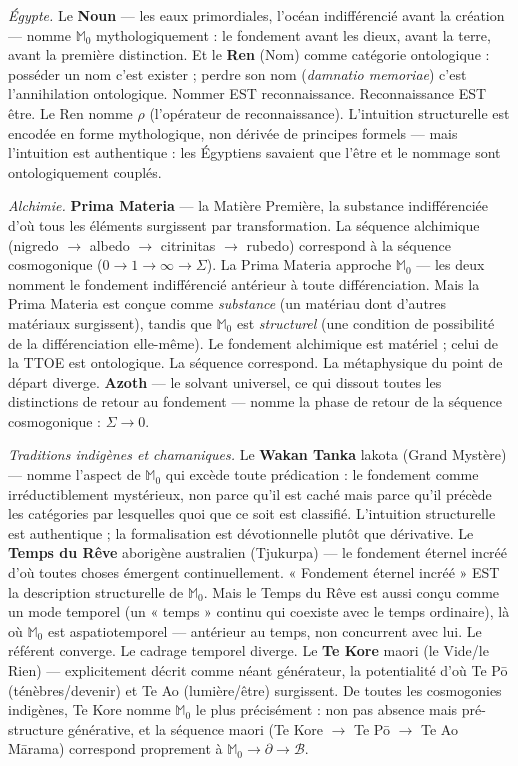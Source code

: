 \documentclass[10pt, openany, oneside]{book}
\begin{document}
\textit{Égypte.} Le \textbf{Noun} --- les eaux primordiales, l'océan indifférencié avant la création --- nomme $\mathbb{M}_0$ mythologiquement : le fondement avant les dieux, avant la terre, avant la première distinction. Et le \textbf{Ren} (Nom) comme catégorie ontologique : posséder un nom c'est exister ; perdre son nom (\textit{damnatio memoriae}) c'est l'annihilation ontologique. Nommer EST reconnaissance. Reconnaissance EST être. Le Ren nomme $\rho$ (l'opérateur de reconnaissance). L'intuition structurelle est encodée en forme mythologique, non dérivée de principes formels --- mais l'intuition est authentique : les Égyptiens savaient que l'être et le nommage sont ontologiquement couplés.

\textit{Alchimie.} \textbf{Prima Materia} --- la Matière Première, la substance indifférenciée d'où tous les éléments surgissent par transformation. La séquence alchimique (nigredo $\to$ albedo $\to$ citrinitas $\to$ rubedo) correspond à la séquence cosmogonique ($0 \to 1 \to \infty \to \Sigma$). La Prima Materia approche $\mathbb{M}_0$ --- les deux nomment le fondement indifférencié antérieur à toute différenciation. Mais la Prima Materia est conçue comme \textit{substance} (un matériau dont d'autres matériaux surgissent), tandis que $\mathbb{M}_0$ est \textit{structurel} (une condition de possibilité de la différenciation elle-même). Le fondement alchimique est matériel ; celui de la TTOE est ontologique. La séquence correspond. La métaphysique du point de départ diverge. \textbf{Azoth} --- le solvant universel, ce qui dissout toutes les distinctions de retour au fondement --- nomme la phase de retour de la séquence cosmogonique : $\Sigma \to 0$.

\textit{Traditions indigènes et chamaniques.} Le \textbf{Wakan Tanka} lakota (Grand Mystère) --- nomme l'aspect de $\mathbb{M}_0$ qui excède toute prédication : le fondement comme irréductiblement mystérieux, non parce qu'il est caché mais parce qu'il précède les catégories par lesquelles quoi que ce soit est classifié. L'intuition structurelle est authentique ; la formalisation est dévotionnelle plutôt que dérivative. Le \textbf{Temps du Rêve} aborigène australien (Tjukurpa) --- le fondement éternel incréé d'où toutes choses émergent continuellement. « Fondement éternel incréé » EST la description structurelle de $\mathbb{M}_0$. Mais le Temps du Rêve est aussi conçu comme un mode temporel (un « temps » continu qui coexiste avec le temps ordinaire), là où $\mathbb{M}_0$ est aspatiotemporel --- antérieur au temps, non concurrent avec lui. Le référent converge. Le cadrage temporel diverge. Le \textbf{Te Kore} maori (le Vide/le Rien) --- explicitement décrit comme néant générateur, la potentialité d'où Te P\={o} (ténèbres/devenir) et Te Ao (lumière/être) surgissent. De toutes les cosmogonies indigènes, Te Kore nomme $\mathbb{M}_0$ le plus précisément : non pas absence mais pré-structure générative, et la séquence maori (Te Kore $\to$ Te P\={o} $\to$ Te Ao M\={a}rama) correspond proprement à $\mathbb{M}_0 \to \partial \to \mathcal{B}$.
\end{document}
